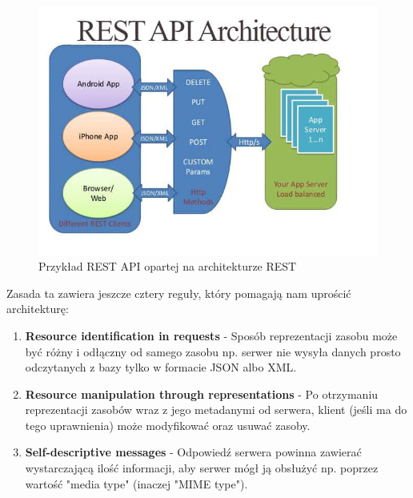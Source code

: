 \documentclass[oneside,polski,logo,indent]{amuthesis}
\begin{document}
\begin{enumerate}
\begin{enumerate}
\begin{figure}[H]
\centering
\includegraphics[width=14cm]{restarch.jpg}
\caption{Przykład REST API opartej na architekturze REST}
\label{REST API}
\end{figure}

Zasada ta zawiera jeszcze cztery reguły, który pomagają nam uprościć architekturę: 
\begin{enumerate}
\item \textbf{Resource identification in requests} - Sposób reprezentacji zasobu może być różny i odłączny od samego zasobu np. serwer nie wysyła danych prosto odczytanych z bazy tylko w formacie JSON albo XML.\newline  

\item \textbf{Resource manipulation through representations}  - Po otrzymaniu reprezentacji zasobów wraz z jego metadanymi od serwera, klient (jeśli ma do tego uprawnienia) może modyfikować oraz usuwać zasoby.\newline  

\item \textbf{Self-descriptive messages} - Odpowiedź serwera powinna zawierać wystarczającą ilość informacji, aby serwer mógł ją obsłużyć np. poprzez wartość "media type" (inaczej "MIME type").\newline  


\end{enumerate}
\end{enumerate}
\end{enumerate}
\end{document}
